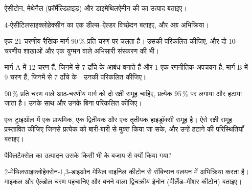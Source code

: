 \begin{exercise}[$\star$]\label{exo:b3:total-synthesis:3}
ऐसीटोन, मेथेनैल (फ़ॉर्मैल्डिहाइड) और डाइमेथिलऐमीन की  का उत्पाद
बताइए।
\end{exercise}

\begin{exercise}[$\star$]\label{exo:b3:total-synthesis:4}
4-ऐसीटिलसाइक्लोहेक्सीन का एक डील्स--ऐल्डर विच्छेदन बताइए, और अग्र
अभिक्रिया।
\end{exercise}

\begin{exercise}[$\star\star$]\label{exo:b3:total-synthesis:5}
एक 21-चरणीय रैखिक मार्ग 90\,\% प्रति चरण पर चलता है। उसकी  परिकलित कीजिए, और
दो 10-चरणीय शाखाओं और एक युग्मन वाले अभिसारी संस्करण की भी।
\end{exercise}

\begin{exercise}[$\star\star$]\label{exo:b3:total-synthesis:6}
मार्ग A में 12 चरण हैं, जिनमें से 7 ढाँचे के आबंध बनाते हैं और 1 एक रणनीतिक
अपचयन है; मार्ग B में 9 चरण हैं, जिनमें से 7 ढाँचे के। उनकी  परिकलित कीजिए।
\end{exercise}

\begin{exercise}[$\star\star$]\label{exo:b3:total-synthesis:7}
90\,\% प्रति चरण वाले आठ-चरणीय मार्ग को दो रक्षी समूह चाहिए, प्रत्येक 95\,\% पर लगाया और
हटाया जाता है। उनके साथ और उनके बिना  परिकलित कीजिए।
\end{exercise}

\begin{exercise}[$\star\star$]\label{exo:b3:total-synthesis:8}
एक ट्राइऑल में एक प्राथमिक, एक द्वितीयक और एक तृतीयक हाइड्रॉक्सी समूह है। ऐसे
रक्षी समूह प्रस्तावित कीजिए जिनसे प्रत्येक को बारी-बारी से मुक्त किया जा सके, और उन्हें हटाने की
परिस्थितियाँ बताइए।
\end{exercise}

\begin{exercise}[$\star\star$]\label{exo:b3:total-synthesis:9}
पैक्लिटैक्सेल का उत्पादन उसके किसी भी  के बजाय  से क्यों किया गया?
\end{exercise}

\begin{exercise}[$\star\star\star$]\label{exo:b3:total-synthesis:10}
2-मेथिलसाइक्लोहेक्सेन-1,3-डाइओन मेथिल वाइनिल कीटोन से रॉबिन्सन
वलयन में अभिक्रिया करता है। माइकल और ऐल्डोल चरण पहचानिए और बनने वाला द्विचक्रीय ईनोन
(वीलैंड--मीशर कीटोन) बताइए।
\end{exercise}

